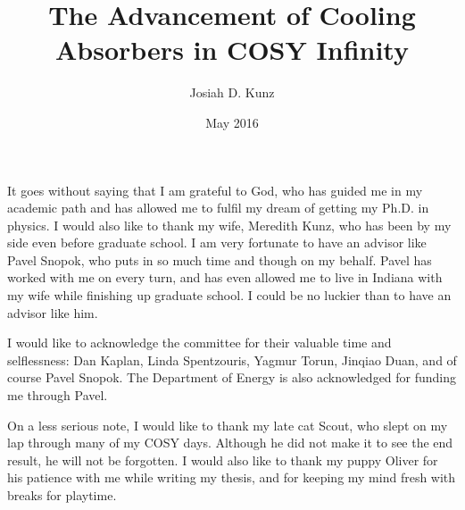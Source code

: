 \title{The Advancement of Cooling\\
Absorbers in COSY Infinity}
\author{Josiah D. Kunz}
\date{May 2016}
\copyrightnoticefalse      %
\maketitle                %


\prelimpages         %


\begin{acknowledgement}

It goes without saying that I am grateful to God, who has guided me in my academic path and has allowed me to fulfil my dream of getting my Ph.D. in physics. I would also like to thank my wife, Meredith Kunz, who has been by my side even before graduate school. I am very fortunate to have an advisor like Pavel Snopok, who puts in so much time and though on my behalf. Pavel has worked with me on every turn, and has even allowed me to live in Indiana with my wife while finishing up graduate school. I could be no luckier than to have an advisor like him. 

I would like to acknowledge the committee for their valuable time and selflessness: Dan Kaplan, Linda Spentzouris, Yagmur Torun, Jinqiao Duan, and of course Pavel Snopok. The Department of Energy is also acknowledged for funding me through Pavel.

On a less serious note, I would like to thank my late cat Scout, who slept on my lap through many of my COSY days. Although he did not make it to see the end result, he will not be forgotten. I would also like to thank my puppy Oliver for his patience with me while writing my thesis, and for keeping my mind fresh with breaks for playtime.

\end{acknowledgement}


\tableofcontents
\clearpage

\listoftables

\clearpage

\listoffigures

\clearpage